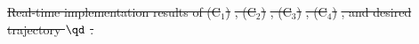 \documentclass[letterpaper, journal]{IEEEtran}
\newcommand*{\figSizeTwoCol}{.49}
\newcommand{\src}{./src} %
\providecommand{\DIFdel}[1]{{\protect\color{red}\sout{#1}}} %
\providecommand{\DIFdelbegin}{} %
\providecommand{\DIFdelFL}[1]{\DIFdel{#1}} %
\begin{document}
\DIFdelbegin %
{%
\DIFdelFL{Real-time implementation results of (C$_1$) }%
\DIFdelFL{, (C$_2$) }%
\DIFdelFL{, (C$_3$) }%
\DIFdelFL{, (C$_4$) }%
\DIFdelFL{, and desired trajectory $\qd$ }%
\DIFdelFL{.
    }}
\end{document}
